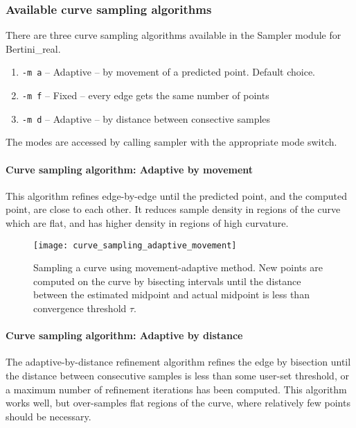  	\subsubsection{Available curve sampling algorithms}
 	

 	There are three curve sampling algorithms available in the Sampler module for Bertini\_real.

 	\begin{enumerate}

 		\item {\tt -m a} -- Adaptive -- by movement of a predicted point.  Default choice.

 		\item {\tt -m f} -- Fixed -- every edge gets the same number of points

 		\item {\tt -m d} -- Adaptive -- by distance between consective samples

 	\end{enumerate}

The modes are accessed by calling sampler with the appropriate mode switch.


\paragraph{Curve sampling algorithm: Adaptive by movement}

This algorithm refines edge-by-edge until the predicted point, and the computed point, are close to each other.  It reduces sample density in regions of the curve which are flat, and has higher density in regions of high curvature.

\begin{center}
\begin{figure}[H]
\texttt{[image: curve\_sampling\_adaptive\_movement]}
\caption[Adaptive-movement curve sampling]{Sampling a curve using movement-adaptive method.  New points are computed on the curve by bisecting intervals until the distance between the estimated midpoint and actual midpoint is less than convergence threshold $\tau$.}
\end{figure}
\end{center}

\paragraph{Curve sampling algorithm: Adaptive by distance}

The adaptive-by-distance refinement algorithm refines the edge by bisection until the distance between consecutive samples is less than some user-set threshold, or a maximum number of refinement iterations has been computed.  This algorithm works well, but over-samples flat regions of the curve, where relatively few points should be necessary.  

